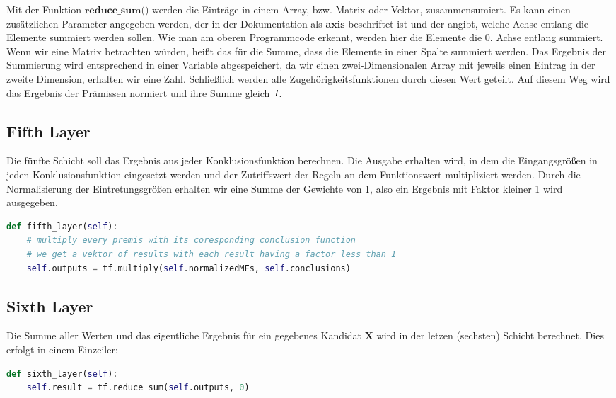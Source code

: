 Mit der Funktion $\textbf{reduce\_sum()}$ werden die Einträge in einem Array, bzw. Matrix oder Vektor, zusammensumiert. Es kann einen zusätzlichen Parameter angegeben werden, der in der Dokumentation als $\textbf{axis}$ beschriftet ist und der angibt, welche Achse entlang die Elemente summiert werden sollen. Wie man am oberen Programmcode erkennt, werden hier die Elemente die 0. Achse entlang summiert. Wenn wir eine Matrix betrachten würden, heißt das für die Summe, dass die Elemente in einer Spalte summiert werden. Das Ergebnis der Summierung wird entsprechend in einer Variable abgespeichert, da wir einen zwei-Dimensionalen Array mit jeweils einen Eintrag in der zweite Dimension, erhalten wir eine Zahl. Schließlich werden alle Zugehörigkeitsfunktionen durch diesen Wert geteilt. Auf diesem Weg wird das Ergebnis der Prämissen normiert und ihre Summe gleich $\emph{1}$.

\subsection{Fifth Layer}\label{fifth-layer}

Die fünfte Schicht soll das Ergebnis aus jeder Konklusionsfunktion berechnen. Die Ausgabe erhalten wird, in dem die Eingangsgrößen in jeden Konklusionsfunktion eingesetzt werden und der Zutriffswert der Regeln an dem Funktionswert multipliziert werden. Durch die Normalisierung der Eintretungsgrößen erhalten wir eine Summe der Gewichte von 1, also ein Ergebnis mit Faktor kleiner 1 wird ausgegeben.

\begin{lstlisting}[language=Python]
def fifth_layer(self):
	# multiply every premis with its coresponding conclusion function
	# we get a vektor of results with each result having a factor less than 1
	self.outputs = tf.multiply(self.normalizedMFs, self.conclusions)
\end{lstlisting}

\subsection{Sixth Layer}\label{sixth-layer}

Die Summe aller Werten und das eigentliche Ergebnis für ein gegebenes Kandidat $\textbf{X}$ wird in der letzen (sechsten) Schicht berechnet. Dies erfolgt in einem Einzeiler:

\begin{lstlisting}[language=Python]
def sixth_layer(self):
	self.result = tf.reduce_sum(self.outputs, 0)
\end{lstlisting}

